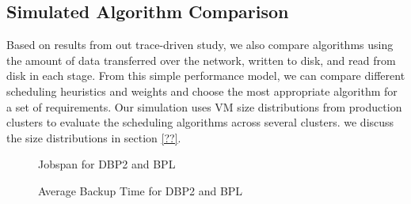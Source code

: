 \subsection{Simulated Algorithm Comparison}

Based on results from out trace-driven study, we also compare algorithms using
the amount of data transferred over the network, written to disk, and read from
disk in each stage. From this simple performance model, we can compare
different scheduling heuristics and weights and choose the most appropriate
algorithm for a set of requirements. Our simulation uses VM size distributions
from production clusters to evaluate the scheduling algorithms across several
clusters. we discuss the size distributions in section \ref{??}.


\begin{figure}[ht]
  \centering
  \caption{Jobspan for DBP2 and BPL}
  \label{fig:jobspan-comparison}
\end{figure}

\begin{figure}[ht]
  \centering
  \caption{Average Backup Time for DBP2 and BPL}
  \label{fig:avgbackup-comparison}
\end{figure}

